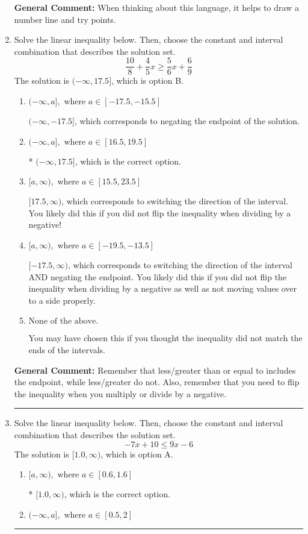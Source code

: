 \documentclass{extbook}[14pt]
\newcommand{\litem}[1]{\item #1

\rule{\textwidth}{0.4pt}}
\begin{document}
\begin{enumerate}
{\textbf{General Comment:} When thinking about this language, it helps to draw a number line and try points.
}
\litem{
Solve the linear inequality below. Then, choose the constant and interval combination that describes the solution set.
\[ \frac{10}{8} + \frac{4}{5} x \geq \frac{5}{6} x + \frac{6}{9} \]
The solution is \( (-\infty, 17.5] \), which is option B.\begin{enumerate}[label=\Alph*.]
\item \( (-\infty, a], \text{ where } a \in [-17.5, -15.5] \)

 $(-\infty, -17.5]$, which corresponds to negating the endpoint of the solution.
\item \( (-\infty, a], \text{ where } a \in [16.5, 19.5] \)

* $(-\infty, 17.5]$, which is the correct option.
\item \( [a, \infty), \text{ where } a \in [15.5, 23.5] \)

 $[17.5, \infty)$, which corresponds to switching the direction of the interval. You likely did this if you did not flip the inequality when dividing by a negative!
\item \( [a, \infty), \text{ where } a \in [-19.5, -13.5] \)

 $[-17.5, \infty)$, which corresponds to switching the direction of the interval AND negating the endpoint. You likely did this if you did not flip the inequality when dividing by a negative as well as not moving values over to a side properly.
\item \( \text{None of the above}. \)

You may have chosen this if you thought the inequality did not match the ends of the intervals.
\end{enumerate}

\textbf{General Comment:} Remember that less/greater than or equal to includes the endpoint, while less/greater do not. Also, remember that you need to flip the inequality when you multiply or divide by a negative.
}
\litem{
Solve the linear inequality below. Then, choose the constant and interval combination that describes the solution set.
\[ -7x + 10 \leq 9x -6 \]
The solution is \( [1.0, \infty) \), which is option A.\begin{enumerate}[label=\Alph*.]
\item \( [a, \infty), \text{ where } a \in [0.6, 1.6] \)

* $[1.0, \infty)$, which is the correct option.
\item \( (-\infty, a], \text{ where } a \in [0.5, 2] \)


\end{enumerate}}
\end{enumerate}
\end{document}
